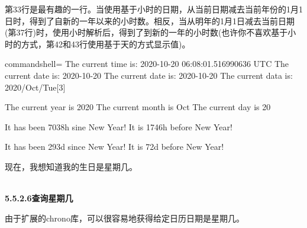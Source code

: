 第33行是最有趣的一行。当使用基于小时的日期，从当前日期减去当前年份的1月1日时，得到了自新的一年以来的小时数。相反，当从明年的1月1日减去当前日期(第37行)时，使用小时解析后，得到了到新的一年的小时数(也许你不喜欢基于小时的方式，第42和43行使用基于天的方式显示值)。

\begin{tcblisting}{commandshell={}}
The current time is: 2020-10-20 06:08:01.516990636 UTC
The current date is: 2020-10-20
The current date is: 2020-10-20
The current data is: 2020/Oct/Tue[3]

The current year is 2020
The current month is Oct
The current day is 20

It has been 7038h sine New Year!
It is 1746h before New Year!

It has been 293d since New Year!
It is 72d before New Year!
\end{tcblisting}

现在，我想知道我的生日是星期几。

\hspace*{\fill} \\ %
\noindent
\textbf{5.5.2.6\hspace{0.2cm}查询星期几}

由于扩展的chrono库，可以很容易地获得给定日历日期是星期几。


